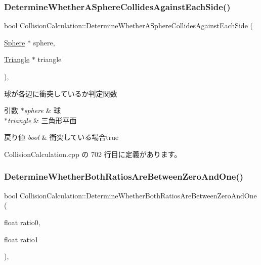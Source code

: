 \subsubsection{\texorpdfstring{Determine\+Whether\+A\+Sphere\+Collides\+Against\+Each\+Side()}{DetermineWhetherASphereCollidesAgainstEachSide()}}
{\footnotesize\ttfamily bool Collision\+Calculation\+::\+Determine\+Whether\+A\+Sphere\+Collides\+Against\+Each\+Side (\begin{DoxyParamCaption}\item[{\mbox{\hyperlink{class_sphere}{Sphere}} $\ast$}]{sphere,  }\item[{\mbox{\hyperlink{class_triangle}{Triangle}} $\ast$}]{triangle }\end{DoxyParamCaption})\hspace{0.3cm}{\ttfamily [static]}, {\ttfamily [private]}}



球が各辺に衝突しているか判定関数 


\begin{DoxyParams}{引数}
{\em $\ast$sphere} & 球 \\
\hline
{\em $\ast$triangle} & 三角形平面 \\
\hline
\end{DoxyParams}

\begin{DoxyRetVals}{戻り値}
{\em bool} & 衝突している場合true \\
\hline
\end{DoxyRetVals}


 Collision\+Calculation.\+cpp の 702 行目に定義があります。

\mbox{\label{class_collision_calculation_abae15654adac71bcdbe0b9a31554c827}} 
\subsubsection{\texorpdfstring{Determine\+Whether\+Both\+Ratios\+Are\+Between\+Zero\+And\+One()}{DetermineWhetherBothRatiosAreBetweenZeroAndOne()}}
{\footnotesize\ttfamily bool Collision\+Calculation\+::\+Determine\+Whether\+Both\+Ratios\+Are\+Between\+Zero\+And\+One (\begin{DoxyParamCaption}\item[{float}]{ratio0,  }\item[{float}]{ratio1 }\end{DoxyParamCaption})\hspace{0.3cm}{\ttfamily [static]}, {\ttfamily [private]}}



